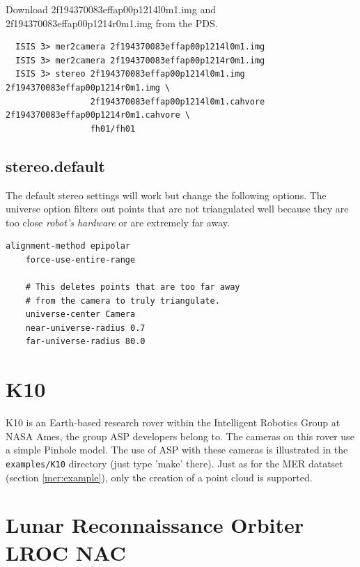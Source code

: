 Download 2f194370083effap00p1214l0m1.img and
2f194370083effap00p1214r0m1.img from the \ac{PDS}.

\begin{verbatim}
  ISIS 3> mer2camera 2f194370083effap00p1214l0m1.img
  ISIS 3> mer2camera 2f194370083effap00p1214r0m1.img
  ISIS 3> stereo 2f194370083effap00p1214l0m1.img 2f194370083effap00p1214r0m1.img \
                 2f194370083effap00p1214l0m1.cahvore 2f194370083effap00p1214r0m1.cahvore \
                 fh01/fh01
\end{verbatim}

\subsection*{stereo.default}

The default stereo settings will work but change the following
options. The universe option filters out points that are not
triangulated well because they are too close \emph{robot's hardware}
or are extremely far away.

\begin{center}\begin{minipage}{5.5in}
\begin{Verbatim}[frame=single,fontsize=\small,label=additional settings for MER]
    alignment-method epipolar
    force-use-entire-range

    # This deletes points that are too far away
    # from the camera to truly triangulate.
    universe-center Camera
    near-universe-radius 0.7
    far-universe-radius 80.0
\end{Verbatim}
\end{minipage}\end{center}

\clearpage
\section{K10}\label{k10:example}

K10 is an Earth-based research rover within the Intelligent
Robotics Group at NASA Ames, the group ASP developers belong to. The
cameras on this rover use a simple Pinhole model. The use of ASP with
these cameras is illustrated in the \texttt{examples/K10} directory
(just type 'make' there).  Just as for the MER datatset (section
\ref{mer:example}), only the creation of a point cloud is supported.

\clearpage
\section{Lunar Reconnaissance Orbiter LROC NAC}
\label{lronac-example}


